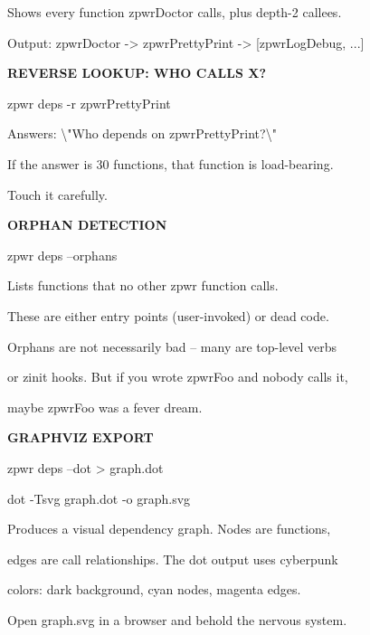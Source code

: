 \documentclass[11pt,a4paper,twoside]{book}
\begin{document}
Shows every function zpwrDoctor calls, plus depth-2 callees.

Output:  zpwrDoctor -> zpwrPrettyPrint -> [zpwrLogDebug, ...]


\vspace{12pt}
{\bfseries\color{neonyellow} REVERSE LOOKUP: WHO CALLS X?}\vspace{4pt}

\begin{codebox}
zpwr deps -r zpwrPrettyPrint\\
\end{codebox}

Answers: \textbackslash{}"Who depends on zpwrPrettyPrint?\textbackslash{}"

If the answer is 30 functions, that function is load-bearing.

Touch it carefully.


\vspace{12pt}
{\bfseries\color{neonyellow} ORPHAN DETECTION}\vspace{4pt}

\begin{codebox}
zpwr deps --orphans\\
\end{codebox}

Lists functions that no other zpwr function calls.

These are either entry points (user-invoked) or dead code.

Orphans are not necessarily bad -- many are top-level verbs

or zinit hooks. But if you wrote zpwrFoo and nobody calls it,

maybe zpwrFoo was a fever dream.


\vspace{12pt}
{\bfseries\color{neonyellow} GRAPHVIZ EXPORT}\vspace{4pt}

\begin{codebox}
zpwr deps --dot > graph.dot\\
\end{codebox}

dot -Tsvg graph.dot -o graph.svg

Produces a visual dependency graph. Nodes are functions,

edges are call relationships. The dot output uses cyberpunk

colors: dark background, cyan nodes, magenta edges.

Open graph.svg in a browser and behold the nervous system.
\end{document}

